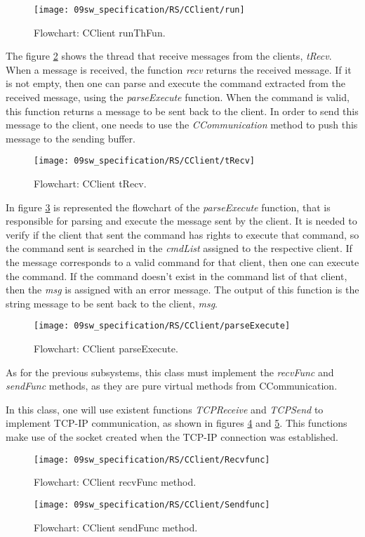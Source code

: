 \begin{figure}[H]
	\centering
	\texttt{[image: 09sw\_specification/RS/CClient/run]}
	\caption{Flowchart: CClient runThFun.}
	\label{fig:clientRun}
\end{figure}

The figure \ref{fig:RSRecv} shows the thread that receive messages from the clients, \textit{tRecv}. When a message is received, the function \textit{recv} returns the received message. If it is not empty, then one can parse and execute the command extracted from the received message, using the \textit{parseExecute} function. When the command is valid, this function returns a message to be sent back to the client. In order to send this message to the client, one needs to use the \textit{CCommunication} method to push this message to the sending buffer.

\begin{figure}[H]
	\centering
	\texttt{[image: 09sw\_specification/RS/CClient/tRecv]}
	\caption{Flowchart: CClient tRecv.}
	\label{fig:RSRecv}
\end{figure}

In figure \ref{fig:parseExecute} is represented the flowchart of the \textit{parseExecute} function, that is responsible for parsing and execute the message sent by the client. It is needed to verify if the client that sent the command has rights to execute that command, so the command sent is searched in the \textit{cmdList} assigned to the respective client. If the message corresponds to a valid command for that client, then one can execute the command. If the command doesn't exist in the command list of that client, then the \textit{msg} is assigned with an error message. The output of this function is the string message to be sent back to the client, \textit{msg}.

\begin{figure}[H]
	\centering
	\texttt{[image: 09sw\_specification/RS/CClient/parseExecute]}
	\caption{Flowchart: CClient parseExecute.}
	\label{fig:parseExecute}
\end{figure}

As for the previous subsystems, this class must implement the \textit{recvFunc} and \textit{sendFunc} methods, as they are pure virtual methods from CCommunication. 

In this class, one will use existent functions \textit{TCPReceive} and \textit{TCPSend} to implement TCP-IP communication, as shown in figures \ref{fig:RSrecvfunc} and \ref{fig:RSsendfunc}. This functions make use of the socket created when the TCP-IP connection was established.

\begin{figure}[H]
	\centering
	\texttt{[image: 09sw\_specification/RS/CClient/Recvfunc]}
	\caption{Flowchart: CClient recvFunc method.}
	\label{fig:RSrecvfunc}
\end{figure}

\begin{figure}[H]
	\centering
	\texttt{[image: 09sw\_specification/RS/CClient/Sendfunc]}
	\caption{Flowchart: CClient sendFunc method.}
	\label{fig:RSsendfunc}
\end{figure}